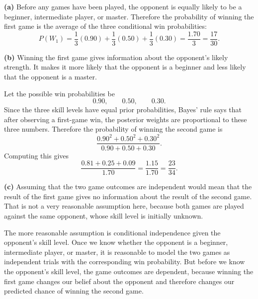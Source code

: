 \documentclass[11pt]{article}
\begin{document}
\begin{solutionbox}
\textbf{(a)} Before any games have been played, the opponent is equally likely to be a beginner, intermediate player, or master. Therefore the probability of winning the first game is the average of the three conditional win probabilities:
\[
P(W_1)
=
\frac13(0.90)+\frac13(0.50)+\frac13(0.30)
=
\frac{1.70}{3}
=
\frac{17}{30}.
\]


\textbf{(b)} Winning the first game gives information about the opponent's likely strength. It makes it more likely that the opponent is a beginner and less likely that the opponent is a master.

Let the possible win probabilities be
\[
0.90,
\qquad
0.50,
\qquad
0.30.
\]
Since the three skill levels have equal prior probabilities, Bayes' rule says that after observing a first-game win, the posterior weights are proportional to these three numbers. Therefore the probability of winning the second game is
\[
\frac{0.90^2+0.50^2+0.30^2}{0.90+0.50+0.30}.
\]
Computing this gives
\[
\frac{0.81+0.25+0.09}{1.70}
=
\frac{1.15}{1.70}
=
\frac{23}{34}.
\]



\textbf{(c)} Assuming that the two game outcomes are independent would mean that the result of the first game gives no information about the result of the second game. That is not a very reasonable assumption here, because both games are played against the same opponent, whose skill level is initially unknown.

The more reasonable assumption is conditional independence given the opponent's skill level. Once we know whether the opponent is a beginner, intermediate player, or master, it is reasonable to model the two games as independent trials with the corresponding win probability. But before we know the opponent's skill level, the game outcomes are dependent, because winning the first game changes our belief about the opponent and therefore changes our predicted chance of winning the second game.

\end{solutionbox}
\end{document}
